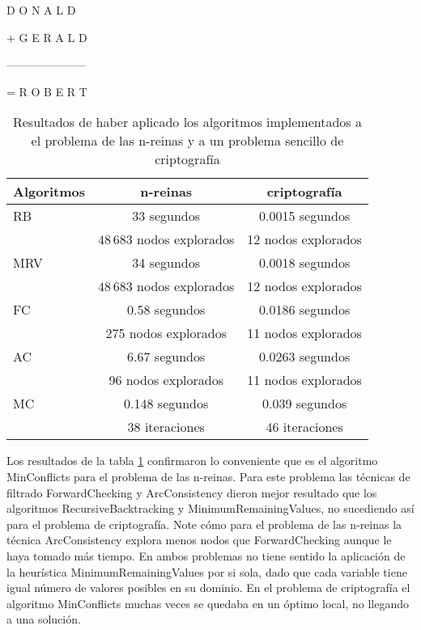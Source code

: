 \begin{center}
\quad D O N A L D
	
+ G E R A L D

---------------------

= R O B E R T
\end{center}

\begin{table}[h]
	\caption{Resultados de haber aplicado los algoritmos implementados a el problema de las n-reinas y a un problema sencillo de criptograf\'ia}
	\begin{center}
		\label{2problemas}
		\begin{tabular}{|l|c|c||}
			\hline \hline
			Algoritmos & n-reinas & criptograf\'ia \\ \hline
			RB & 33 segundos & 0.0015 segundos \\
			 & $48\,683$ nodos explorados & 12 nodos explorados \\ \hline
			MRV & 34 segundos &  0.0018 segundos \\
			 & $48\,683$ nodos explorados & 12 nodos explorados \\ \hline
			FC & 0.58 segundos & 0.0186 segundos \\
			 & 275 nodos explorados & 11 nodos explorados \\ \hline
			AC & 6.67 segundos &  0.0263 segundos \\
			 & 96 nodos explorados & 11 nodos explorados \\ \hline
			MC & 0.148 segundos & 0.039 segundos \\
			 & 38 iteraciones & 46 iteraciones \\ \hline
		\end{tabular}
	\end{center}
\end{table}

Los resultados de la tabla \ref{2problemas} confirmaron lo conveniente que es el algoritmo \textsf{MinConflicts} para el problema de las n-reinas. Para este problema las t\'ecnicas de filtrado \textsf{ForwardChecking} y \textsf{ArcConsistency} dieron mejor resultado que los algoritmos \textsf{RecursiveBacktracking} y \textsf{MinimumRemainingValues}, no sucediendo as\'i para el problema de criptograf\'ia. Note c\'omo para el problema de las n-reinas la t\'ecnica \textsf{ArcConsistency} explora menos nodos que \textsf{ForwardChecking} aunque le haya tomado m\'as tiempo. En ambos problemas no tiene sentido la aplicaci\'on de la heur\'istica \textsf{MinimumRemainingValues} por si sola, dado que cada variable tiene igual n\'umero de valores posibles en su dominio. En el problema de criptograf\'ia el algoritmo \textsf{MinConflicts} muchas veces se quedaba en un \'optimo local, no llegando a una soluci\'on.


